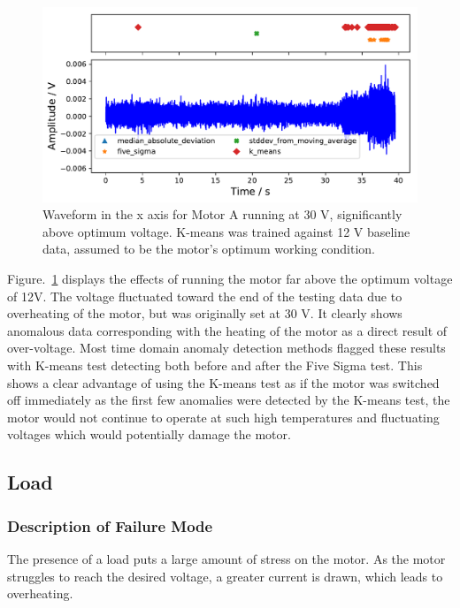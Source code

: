 \begin{figure}[t]
    \includegraphics[width=1.0\textwidth]{fig/large_30V_large_12V.pdf}
    \caption[Overvoltage of Large Motor]{Waveform in the x axis for Motor A running at 30 V, significantly above optimum voltage. K-means was trained against 12 V baseline data, assumed to be the motor's optimum working condition.}
    \label{fig:largemotor_30V}
\end{figure}

Figure.~\ref{fig:largemotor_30V} displays the effects of running the motor far above the optimum voltage of 12V. The voltage fluctuated toward the end of the testing data due to overheating of the motor, but was originally set at 30 V. It clearly shows anomalous data corresponding with the heating of the motor as a direct result of over-voltage. Most time domain anomaly detection methods flagged these results with K-means test detecting both before and after the Five Sigma test. This shows a clear advantage of using the K-means test as if the motor was switched off immediately as the first few anomalies were detected by the K-means test, the motor would not continue to operate at such high temperatures and fluctuating voltages which would potentially damage the motor.

\subsection{Load}

\subsubsection{Description of Failure Mode}
The presence of a load puts a large amount of stress on the motor. As the motor struggles to reach the desired voltage, a greater current is drawn, which leads to overheating.
        
